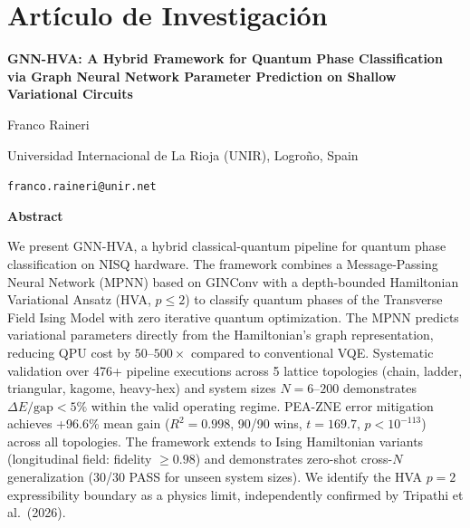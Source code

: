 \documentclass[11pt,a4paper,spanish]{book}
\begin{document}

\chapter{Artículo de Investigación}
\label{app:articulo}


\begin{center}
{\LARGE \textbf{GNN-HVA: A Hybrid Framework for Quantum Phase Classification via Graph Neural Network Parameter Prediction on Shallow Variational Circuits}}

\vspace{0.5cm}

{\large Franco Raineri}

\vspace{0.2cm}

{\normalsize Universidad Internacional de La Rioja (UNIR), Logroño, Spain}

{\normalsize \texttt{franco.raineri@unir.net}}

\vspace{0.5cm}

{\textbf{Abstract}}
\end{center}

\noindent We present GNN-HVA, a hybrid classical-quantum pipeline for quantum phase classification on NISQ hardware. The framework combines a Message-Passing Neural Network (MPNN) based on GINConv with a depth-bounded Hamiltonian Variational Ansatz (HVA, $p \leq 2$) to classify quantum phases of the Transverse Field Ising Model with zero iterative quantum optimization. The MPNN predicts variational parameters directly from the Hamiltonian's graph representation, reducing QPU cost by $50$--$500\times$ compared to conventional VQE. Systematic validation over 476+ pipeline executions across 5 lattice topologies (chain, ladder, triangular, kagome, heavy-hex) and system sizes $N = 6$--$200$ demonstrates $\Delta E/\text{gap} < 5\%$ within the valid operating regime. PEA-ZNE error mitigation achieves +96.6\% mean gain ($R^2 = 0.998$, 90/90 wins, $t = 169.7$, $p < 10^{-113}$) across all topologies. The framework extends to Ising Hamiltonian variants (longitudinal field: fidelity $\geq 0.98$) and demonstrates zero-shot cross-$N$ generalization (30/30 PASS for unseen system sizes). We identify the HVA $p = 2$ expressibility boundary as a physics limit, independently confirmed by Tripathi et al.\ (2026).
\end{document}
